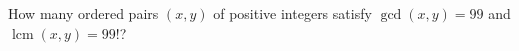 How many ordered pairs $(x,y)$ of positive integers satisfy $\gcd(x,y)=99$ and $\operatorname{lcm}(x,y)=99!$?
